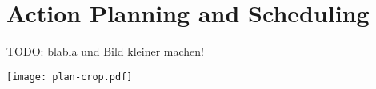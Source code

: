 \section{Action Planning and Scheduling}\label{sec:plan}



TODO: blabla und Bild kleiner machen!


\texttt{[image: plan-crop.pdf]}